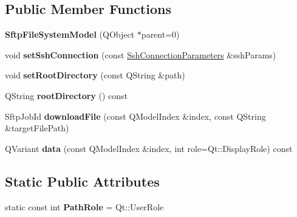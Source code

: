 \subsection*{Public Member Functions}
\begin{DoxyCompactItemize}
\item 
\mbox{\label{class_q_ssh_1_1_sftp_file_system_model_a13335cba21f1030679873bf210de8ef6}} 
{\bfseries Sftp\+File\+System\+Model} (Q\+Object $\ast$parent=0)
\item 
\mbox{\label{class_q_ssh_1_1_sftp_file_system_model_ade84cfef772a0697e7165a705aa715ea}} 
void {\bfseries set\+Ssh\+Connection} (const \mbox{\hyperlink{class_q_ssh_1_1_ssh_connection_parameters}{Ssh\+Connection\+Parameters}} \&ssh\+Params)
\item 
\mbox{\label{class_q_ssh_1_1_sftp_file_system_model_a803470a6d1e6b1e2857c44fcd41d924d}} 
void {\bfseries set\+Root\+Directory} (const Q\+String \&path)
\item 
\mbox{\label{class_q_ssh_1_1_sftp_file_system_model_a9f909f799788b91ead671d335fb61af7}} 
Q\+String {\bfseries root\+Directory} () const
\item 
\mbox{\label{class_q_ssh_1_1_sftp_file_system_model_aa74c86e21541634237b8b32b1d0f9a39}} 
Sftp\+Job\+Id {\bfseries download\+File} (const Q\+Model\+Index \&index, const Q\+String \&target\+File\+Path)
\item 
\mbox{\label{class_q_ssh_1_1_sftp_file_system_model_a2a2489a06fabc3226167d298557ea6e4}} 
Q\+Variant {\bfseries data} (const Q\+Model\+Index \&index, int role=Qt\+::\+Display\+Role) const
\end{DoxyCompactItemize}
\subsection*{Static Public Attributes}
\begin{DoxyCompactItemize}
\item 
\mbox{\label{class_q_ssh_1_1_sftp_file_system_model_af582cdd946d17a7a3258a79e94aaf206}} 
static const int {\bfseries Path\+Role} = Qt\+::\+User\+Role
\end{DoxyCompactItemize}


